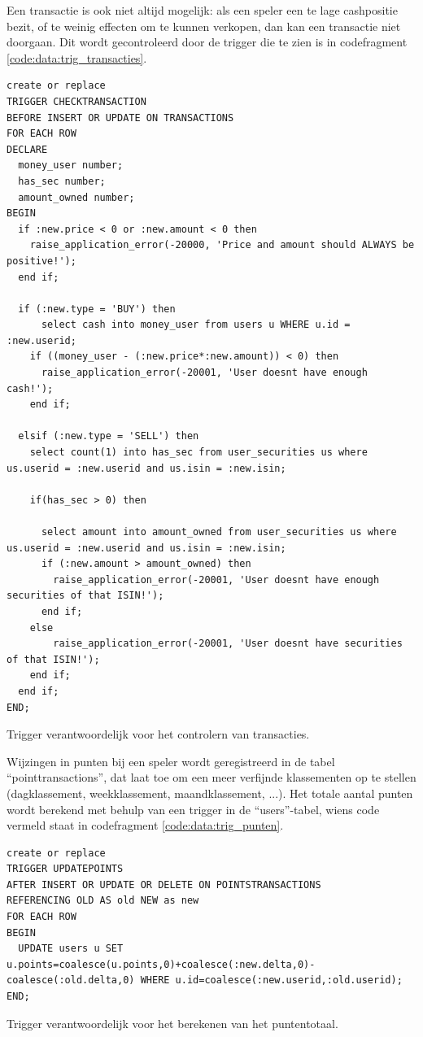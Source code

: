 Een transactie is ook niet altijd mogelijk: als een speler een te lage cashpositie bezit, of te weinig effecten om te kunnen verkopen, dan kan een transactie niet doorgaan. Dit wordt gecontroleerd door de trigger die te zien is in codefragment \ref{code:data:trig_transacties}.

\begin{code}
\begin{lstlisting}
create or replace
TRIGGER CHECKTRANSACTION
BEFORE INSERT OR UPDATE ON TRANSACTIONS 
FOR EACH ROW 
DECLARE
  money_user number;
  has_sec number;
  amount_owned number;
BEGIN
  if :new.price < 0 or :new.amount < 0 then
    raise_application_error(-20000, 'Price and amount should ALWAYS be positive!');
  end if;
    
  if (:new.type = 'BUY') then
      select cash into money_user from users u WHERE u.id = :new.userid;
    if ((money_user - (:new.price*:new.amount)) < 0) then
      raise_application_error(-20001, 'User doesnt have enough cash!');
    end if;

  elsif (:new.type = 'SELL') then
    select count(1) into has_sec from user_securities us where us.userid = :new.userid and us.isin = :new.isin;
    
    if(has_sec > 0) then 
    
      select amount into amount_owned from user_securities us where us.userid = :new.userid and us.isin = :new.isin;
      if (:new.amount > amount_owned) then
        raise_application_error(-20001, 'User doesnt have enough securities of that ISIN!');
      end if;
    else
        raise_application_error(-20001, 'User doesnt have securities of that ISIN!');
    end if;
  end if;
END;
\end{lstlisting}
\caption{Trigger verantwoordelijk voor het controlern van transacties.}
\label{code:data:trig_transacties}
\end{code}


Wijzingen in punten bij een speler wordt geregistreerd in de tabel ``pointtransactions'', dat laat toe om een meer verfijnde klassementen op te stellen (dagklassement, weekklassement, maandklassement, ...). Het totale aantal punten wordt berekend met behulp van een trigger in de ``users''-tabel, wiens code vermeld staat in codefragment \ref{code:data:trig_punten}.

\begin{code}
\begin{lstlisting}
create or replace
TRIGGER UPDATEPOINTS
AFTER INSERT OR UPDATE OR DELETE ON POINTSTRANSACTIONS 
REFERENCING OLD AS old NEW as new
FOR EACH ROW 
BEGIN
  UPDATE users u SET u.points=coalesce(u.points,0)+coalesce(:new.delta,0)-coalesce(:old.delta,0) WHERE u.id=coalesce(:new.userid,:old.userid);
END;
\end{lstlisting}
\caption{Trigger verantwoordelijk voor het berekenen van het puntentotaal.}
\label{code:data:trig_punten}
\end{code}

